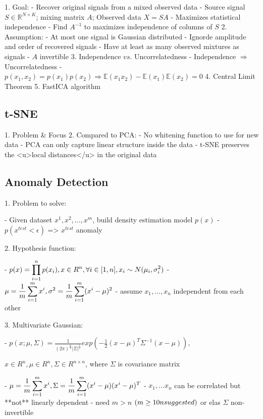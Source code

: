 1. Goal:
- Recover original signals from a mixed observed data
- Source signal $S\in \mathbb R^{N\times K}$; mixing matrix $A$; Observed data $X=SA$
- Maximizes statistical independence
- Find $A^{-1}$ to maximizes independence of columns of $S$
2. Assumption: 
- At most one signal is Gaussian distributed
- Ignorde amplitude and order of recovered signals
- Have at least as many observed mixtures as signals
- $A$ invertible
3. Independence $vs.$ Uncorrelatedness
- Independence $\Rightarrow$ Uncorrelatedness
- $p(x_1,x_2)=p(x_1)p(x_2) \Rightarrow \mathbb E(x_1x_2)-\mathbb E(x_1)\mathbb E(x_2) = 0$ 
4. Central Limit Theorem
5. FastICA algorithm

\subsection{t-SNE}

1. Problem \& Focus
2. Compared to PCA:
- No whitening function to use for new data
- PCA can only capture linear structure inside the data
- t-SNE preserves the <u>local distances</u> in the original data

\subsection{Anomaly Detection}

1. Problem to solve:

- Given dataset {$x^1,x^2,...,x^m$}, build density estimation model $p(x)$
- $p(x^{test}<\epsilon)$ => $x^{test}$ anomaly 

2. Hypothesis function: 

- $\displaystyle p(x)=\prod^n_{i=1} p(x_i), \space x \in R^n,\forall i \in [1,n], \space x_i \sim N(\mu_i,\sigma_i^2)$ 
- $\displaystyle \mu=\frac1m \sum^m_{i=1}x^i,\space \sigma^2=\frac1m \sum^m_{i=1}(x^i-\mu)^2$ 
- assume $x_1,...,x_n$ independent from each other

3. Multivariate Gaussian:

- $\displaystyle p(x;\mu,\Sigma)=\frac1{(2\pi)^{\frac n2} |\Sigma|^{\frac 12}} exp(-\frac12 (x-\mu)^T \Sigma^{-1} (x-\mu)),$  

$x\in R^n, \mu\in R^n,\Sigma\in R^{n\times n}$, where $\Sigma$ is covariance matrix

- $\displaystyle \mu=\frac1m \sum^m_{i=1}x^i,\space \Sigma=\frac 1m \sum^m_{i=1}(x^i-\mu)(x^i-\mu)^T$ 
- $x_1,...x_n$ can be correlated but **not** linearly dependent
- need $m > n$ $(m\ge10n\space suggested)$ or elas $\Sigma$ non-invertible

